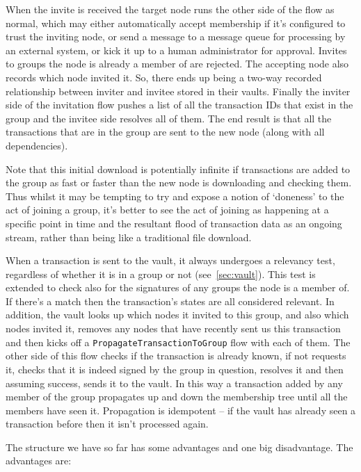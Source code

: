 \documentclass{article}
\begin{document}
When the invite is received the target node runs the other side of the flow as normal, which may either
automatically accept membership if it's configured to trust the inviting node, or send a message to a message queue
for processing by an external system, or kick it up to a human administrator for approval. Invites to groups the
node is already a member of are rejected. The accepting node also records which node invited it. So, there ends up
being a two-way recorded relationship between inviter and invitee stored in their vaults. Finally the inviter side
of the invitation flow pushes a list of all the transaction IDs that exist in the group and the invitee side
resolves all of them. The end result is that all the transactions that are in the group are sent to the new node
(along with all dependencies).

Note that this initial download is potentially infinite if transactions are added to the group as fast or faster
than the new node is downloading and checking them. Thus whilst it may be tempting to try and expose a notion of
`doneness' to the act of joining a group, it's better to see the act of joining as happening at a specific point in
time and the resultant flood of transaction data as an ongoing stream, rather than being like a traditional file
download.

When a transaction is sent to the vault, it always undergoes a relevancy test, regardless of whether it is in a
group or not (see~\cref{sec:vault}). This test is extended to check also for the signatures of any groups the node
is a member of. If there's a match then the transaction's states are all considered relevant. In addition, the
vault looks up which nodes it invited to this group, and also which nodes invited it, removes any nodes that have
recently sent us this transaction and then kicks off a \texttt{PropagateTransactionToGroup} flow with each of them.
The other side of this flow checks if the transaction is already known, if not requests it, checks that it is
indeed signed by the group in question, resolves it and then assuming success, sends it to the vault. In this way a
transaction added by any member of the group propagates up and down the membership tree until all the members have
seen it. Propagation is idempotent -- if the vault has already seen a transaction before then it isn't processed
again.

The structure we have so far has some advantages and one big disadvantage. The advantages are:
\end{document}
